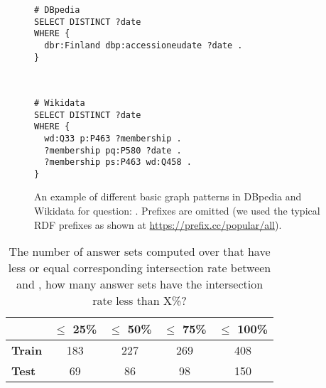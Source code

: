 \documentclass[conference]{IEEEtran}
\begin{document}
\begin{figure*}[t]
\centering
\begin{minipage}[t]{0.44\linewidth}
\begin{lstlisting}[captionpos=b]
# DBpedia
SELECT DISTINCT ?date 
WHERE { 
  dbr:Finland dbp:accessioneudate ?date .
}
\end{lstlisting}
\end{minipage}
\begin{minipage}[t]{0.05\linewidth}
\ 
\end{minipage}
\begin{minipage}[t]{0.44\linewidth}
\begin{lstlisting}[captionpos=b]
# Wikidata
SELECT DISTINCT ?date 
WHERE { 
  wd:Q33 p:P463 ?membership . 
  ?membership pq:P580 ?date . 
  ?membership ps:P463 wd:Q458 . 
}
\end{lstlisting}
\end{minipage}
\caption{An example of different basic graph patterns in DBpedia and Wikidata for question: . Prefixes are omitted (we used the typical RDF prefixes as shown at \href{https://prefix.cc/popular/all}{https://prefix.cc/popular/all}).}
\label{fig:SPARQL}
\end{figure*}

\begin{table*}[t]
\centering
\caption{The number of  answer sets computed over \DBpedia that have less or equal corresponding intersection rate between  and \QALDplus, \ie how many  answer sets have the intersection rate less than X\%?}
\label{tab:answer_set_similarity}
\begin{tabular}{|l|c|c|c|c|}
\hline
 & \textbf{$\leq$ 25\%} & \textbf{$\leq$ 50\%} & \textbf{$\leq$ 75\%} & \textbf{$\leq$ 100\%} \\
 \hline
\textbf{Train}         & 183                        & 227                        & 269                        & 408                         \\
\hline
\textbf{Test}          & 69                         & 86                         & 98                         & 150 \\ \hline

\end{tabular}
\end{table*}
\end{document}
